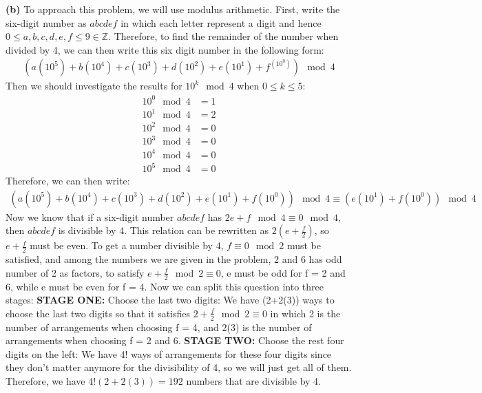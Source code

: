 \documentclass[12pt, letterpaper]{hmcpset}
\begin{document}
\begin{solution}
	\textbf{(b)} To approach this problem, we will use modulus arithmetic. First, write the six-digit number as $abcdef$ in which each letter represent a digit and hence $0\leq a,b,c,d,e,f\leq 9\in\mathbb{Z}$. Therefore, to find the remainder of the number when divided by 4, we can then write this six digit number in the following form:
	\begin{align*}
		(a(10^5)+b(10^4)+c(10^3)+d(10^2)+e(10^1)+f^(10^0)) \mod 4
	\end{align*}
	Then we should investigate the results for $10^k \mod 4$ when $0\leq k\leq 5$:
	\begin{align*}
		10^0 \mod 4 	&= 1	\\
		10^1 \mod 4 	&= 2	\\
		10^2 \mod 4 	&= 0	\\
		10^3 \mod 4 	&= 0	\\
		10^4 \mod 4 	&= 0	\\
		10^5 \mod 4 	&= 0
	\end{align*}
	Therefore, we can then write:
	\begin{align*}
		(a(10^5)+b(10^4)+c(10^3)+d(10^2)+e(10^1)+f(10^0)) \mod 4	\equiv (e(10^1)+f(10^0)) \mod 4
	\end{align*}
	Now we know that if a six-digit number $abcdef$ has $2e+f \mod 4 \equiv 0 \mod 4$, then $abcdef$ is divisible by 4. This relation can be rewritten as $2(e+\frac{f}{2})$, so $e+\frac{f}{2}$ must be even. To get a number divisible by 4, $f \equiv 0 \mod 2$ must be satisfied, and among the numbers we are given in the problem, 2 and 6 has odd number of 2 as factors, to satisfy $e+\frac{f}{2} \mod 2 \equiv 0$, e must be odd for f = 2 and 6, while e must be even for f = 4. Now we can split this question into three stages:
	\newline\newline \textbf{STAGE ONE:} Choose the last two digits:
	\newline We have (2+2(3)) ways to choose the last two digits so that it satisfies $2+\frac{f}{2} \mod 2 \equiv 0$ in which 2 is the number of arrangements when choosing f = 4, and 2(3) is the number of arrangements when choosing f = 2 and 6.
	\newline\newline \textbf{STAGE TWO:} Choose the rest four digits on the left:
	\newline We have 4! ways of arrangements for these four digits since they don't matter anymore for the divisibility of 4, so we will just get all of them.
	\newline\newline Therefore, we have $4!(2+2(3)) = 192$ numbers that are divisible by 4.
\end{solution}
\end{document}
